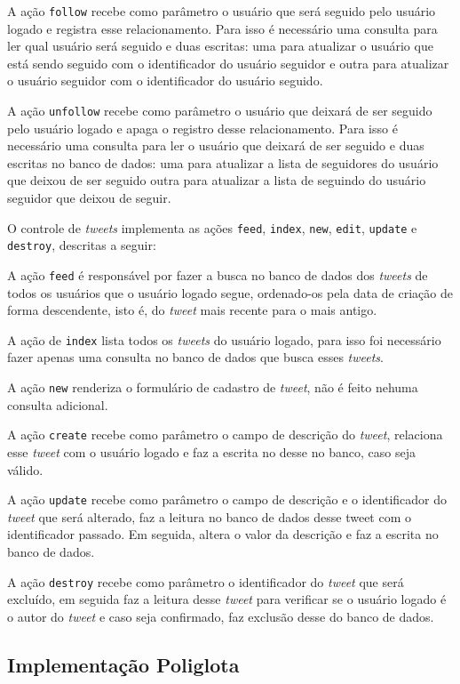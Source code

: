 A ação \verb|follow| recebe como parâmetro o usuário que será seguido pelo usuário logado e registra esse relacionamento. Para isso é necessário uma consulta para ler qual usuário será seguido e duas escritas: uma para atualizar o usuário que está sendo seguido com o identificador do usuário seguidor e outra para atualizar o usuário seguidor com o identificador do usuário seguido.

A ação \verb|unfollow| recebe como parâmetro o usuário que deixará de ser seguido pelo usuário logado e apaga o registro desse relacionamento. Para isso é necessário uma consulta para ler o usuário que deixará de ser seguido e duas escritas no banco de dados: uma para atualizar a lista de seguidores do usuário que deixou de ser seguido outra para atualizar a lista de seguindo do usuário seguidor que deixou de seguir.

O controle de \textit{tweets} implementa as ações \verb|feed|, \verb|index|, \verb|new|, \verb|edit|, \verb|update| e \verb|destroy|, descritas a seguir:

A ação \verb|feed| é responsável por fazer a busca no banco de dados dos \textit{tweets} de todos os usuários que o usuário logado segue, ordenado-os pela data de criação de forma descendente, isto é, do \textit{tweet} mais recente para o mais antigo.

A ação de \verb|index| lista todos os \textit{tweets} do usuário logado, para isso foi necessário fazer apenas uma consulta no banco de dados que busca esses \textit{tweets}.

A ação \verb|new| renderiza o formulário de cadastro de \textit{tweet}, não é feito nehuma consulta adicional.

A ação \verb|create| recebe como parâmetro o campo de descrição do \textit{tweet}, relaciona esse \textit{tweet} com o usuário logado e faz a escrita no desse no banco, caso seja válido.

A ação \verb|update| recebe como parâmetro o campo de descrição e o identificador do \textit{tweet} que será alterado, faz a leitura no banco de dados desse tweet com o identificador passado. Em seguida, altera o valor da descrição e faz a escrita no banco de dados.

A ação \verb|destroy| recebe como parâmetro o identificador do \textit{tweet} que será excluído, em seguida faz a leitura desse \textit{tweet} para verificar se o usuário logado é o autor do \textit{tweet} e caso seja confirmado, faz exclusão desse do banco de dados.


\subsection{Implementação Poliglota}
\label{subsec:polyglot}

